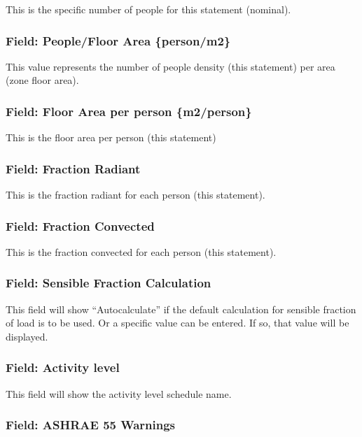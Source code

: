 This is the specific number of people for this statement (nominal).

\subsubsection{Field: People/Floor Area \{person/m2\}}\label{field-peoplefloor-area-personm2}

This value represents the number of people density (this statement) per area (zone floor area).

\subsubsection{Field: Floor Area per person \{m2/person\}}\label{field-floor-area-per-person-m2person}

This is the floor area per person (this statement)

\subsubsection{Field: Fraction Radiant}\label{field-fraction-radiant}

This is the fraction radiant for each person (this statement).

\subsubsection{Field: Fraction Convected}\label{field-fraction-convected}

This is the fraction convected for each person (this statement).

\subsubsection{Field: Sensible Fraction Calculation}\label{field-sensible-fraction-calculation}

This field will show ``Autocalculate'' if the default calculation for sensible fraction of load is to be used. Or a specific value can be entered. If so, that value will be displayed.

\subsubsection{Field: Activity level}\label{field-activity-level}

This field will show the activity level schedule name.

\subsubsection{Field: ASHRAE 55 Warnings}\label{field-ashrae-55-warnings}

